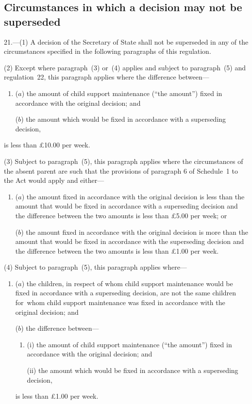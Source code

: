 \documentclass[a4paper,12pt]{article}
\begin{document}
\subsection[21. Circumstances in which a decision may not be superseded]{Circumstances in which a decision may not be superseded}

21.—(1) A decision of the Secretary of State shall not be superseded in any of the circumstances specified in the following paragraphs of this regulation.

(2) Except where paragraph~(3) or~(4) applies and subject to paragraph~(5) and regulation~22, this paragraph applies where the difference between---
\begin{enumerate}\item[]
\begin{sloppypar}
($a$) the amount of child support maintenance (“the amount”) fixed in accordance with the original decision; and
\end{sloppypar}

($b$) the amount which would be fixed in accordance with a superseding decision,
\end{enumerate}
is less than £10$.$00 per week.

(3) Subject to paragraph~(5), this paragraph applies where the circumstances of the absent parent are such that the provisions of paragraph 6 of Schedule~1 to the Act would apply and either---
\begin{enumerate}\item[]
($a$) the amount fixed in accordance with the original decision is less than the amount that would be fixed in accordance with a superseding decision and the difference between the two amounts is less than £5$.$00 per week; or

($b$) the amount fixed in accordance with the original decision is more than the amount that would be fixed in accordance with the superseding decision and the difference between the two amounts is less than £1$.$00 per week.
\end{enumerate}

(4) Subject to paragraph~(5), this paragraph applies where---
\begin{enumerate}\item[]
($a$) the children, in respect of whom child support maintenance would be fixed in accordance with a superseding decision, are not the same children for~whom child support maintenance was fixed in accordance with the original decision; and

($b$) the difference between---
\begin{enumerate}\item[]
(i) the amount of child support maintenance (“the amount”) fixed in accordance with the original decision; and

(ii) the amount which would be fixed in accordance with a superseding decision, 
\end{enumerate}
is less than £1$.$00 per week.
\end{enumerate}
\end{document}
